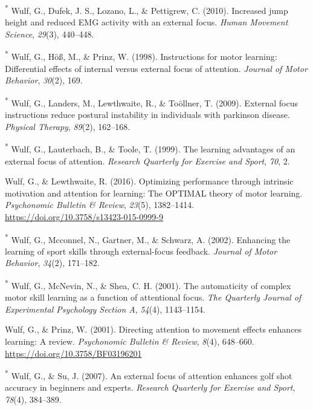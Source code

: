 \documentclass[
  man, donotrepeattitle,floatsintext]{apa7}
\newlength{\cslhangindent}
\newlength{\cslentryspacingunit} %
\newenvironment{CSLReferences}[2] %
 {%
  \setlength{\parindent}{0pt}
  \ifodd #1
  \let\oldpar\par
  \def\par{\hangindent=\cslhangindent\oldpar}
  \fi
  \setlength{\parskip}{#2\cslentryspacingunit}
 }%
 {}
\begin{document}
\begin{CSLReferences}{1}{0}
\leavevmode{}%
\textsuperscript{*} Wulf, G., Dufek, J. S., Lozano, L., \& Pettigrew, C. (2010). Increased jump height and reduced EMG activity with an external focus. \emph{Human Movement Science}, \emph{29}(3), 440--448.

\leavevmode{}%
\textsuperscript{*} Wulf, G., Höß, M., \& Prinz, W. (1998). Instructions for motor learning: Differential effects of internal versus external focus of attention. \emph{Journal of Motor Behavior}, \emph{30}(2), 169.

\leavevmode{}%
\textsuperscript{*} Wulf, G., Landers, M., Lewthwaite, R., \& Toöllner, T. (2009). External focus instructions reduce postural instability in individuals with parkinson disease. \emph{Physical Therapy}, \emph{89}(2), 162--168.

\leavevmode{}%
\textsuperscript{*} Wulf, G., Lauterbach, B., \& Toole, T. (1999). The learning advantages of an external focus of attention. \emph{Research Quarterly for Exercise and Sport}, \emph{70}, 2.

\leavevmode{}%
Wulf, G., \& Lewthwaite, R. (2016). Optimizing performance through intrinsic motivation and attention for learning: {The OPTIMAL} theory of motor learning. \emph{Psychonomic Bulletin \& Review}, \emph{23}(5), 1382--1414. \url{https://doi.org/10.3758/s13423-015-0999-9}

\leavevmode{}%
\textsuperscript{*} Wulf, G., Mcconnel, N., Gartner, M., \& Schwarz, A. (2002). Enhancing the learning of sport skills through external-focus feedback. \emph{Journal of Motor Behavior}, \emph{34}(2), 171--182.

\leavevmode{}%
\textsuperscript{*} Wulf, G., McNevin, N., \& Shea, C. H. (2001). The automaticity of complex motor skill learning as a function of attentional focus. \emph{The Quarterly Journal of Experimental Psychology Section A}, \emph{54}(4), 1143--1154.

\leavevmode{}%
Wulf, G., \& Prinz, W. (2001). Directing attention to movement effects enhances learning: {A} review. \emph{Psychonomic Bulletin \& Review}, \emph{8}(4), 648--660. \url{https://doi.org/10.3758/BF03196201}

\leavevmode{}%
\textsuperscript{*} Wulf, G., \& Su, J. (2007). An external focus of attention enhances golf shot accuracy in beginners and experts. \emph{Research Quarterly for Exercise and Sport}, \emph{78}(4), 384--389.


\end{CSLReferences}
\end{document}
